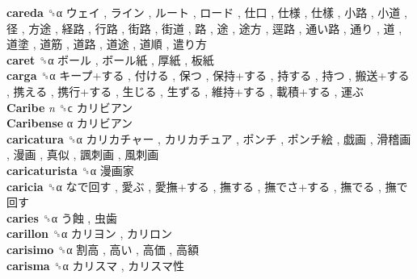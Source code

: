 \textbf{careda} ␝α   ウェイ ,  ライン ,  ルート ,  ロード ,  仕口 ,  仕様 ,  仕樣 ,  小路 ,  小道 ,  径 ,  方途 ,  経路 ,  行路 ,  街路 ,  街道 ,  路 ,  途 ,  途方 ,  逕路 ,  通い路 ,  通り ,  道 ,  道塗 ,  道筋 ,  道路 ,  道途 ,  道順 ,  遣り方   \\
\textbf{caret} ␝α   ボール ,  ボール紙 ,  厚紙 ,  板紙   \\
\textbf{carga} ␝α   キープ+する ,  付ける ,  保つ ,  保持+する ,  持する ,  持つ ,  搬送+する ,  携える ,  携行+する ,  生じる ,  生ずる ,  維持+する ,  載積+する ,  運ぶ   \\
\textbf{Caribe} \emph{n}  ␝ϲ   カリビアン   \\
\textbf{Caribense} α   カリビアン   \\
\textbf{caricatura} ␝α   カリカチャー ,  カリカチュア ,  ポンチ ,  ポンチ絵 ,  戯画 ,  滑稽画 ,  漫画 ,  真似 ,  諷刺画 ,  風刺画   \\
\textbf{caricaturista} ␝α   漫画家   \\
\textbf{caricia} ␝α   なで回す ,  愛ぶ ,  愛撫+する ,  撫する ,  撫でさ+する ,  撫でる ,  撫で回す   \\
\textbf{caries} ␝α   う蝕 ,  虫歯   \\
\textbf{carillon} ␝α   カリヨン ,  カリロン   \\
\textbf{carisimo} ␝α   割高 ,  高い ,  高価 ,  高額   \\
\textbf{carisma} ␝α   カリスマ ,  カリスマ性   \\
